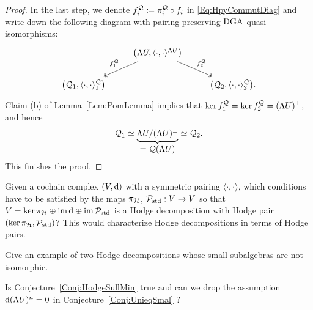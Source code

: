 \documentclass[\MainFolder/Text.tex]{subfiles}
\begin{document}
\begin{proof}
In the last step, we denote $f_i^{\mathcal{Q}}\coloneqq \pi^{\mathcal{Q}}_i \circ f_i$ in \eqref{Eq:HpyCommutDiag} and write down the following diagram with pairing-preserving $\mathrm{DGA}$-quasi-isomorphisms:
\begin{equation}\label{Eq:Diagram}
\begin{tikzcd}
& \arrow[two heads,swap]{ld}{f_1^\VansQuotient} \bigl(\Lambda U,\langle\cdot,\cdot\rangle^{\Lambda U}\bigr)\arrow[two heads]{rd}{f_2^\VansQuotient}& \\
\bigl(\VansQuotient_1,\langle\cdot,\cdot\rangle^{\VansQuotient}_1\bigr) & & \bigl(\VansQuotient_2,\langle\cdot,\cdot\rangle^{\VansQuotient}_2 \bigr).
\end{tikzcd}
\end{equation}
Claim (b) of Lemma~\ref{Lem:PomLemma} implies that $\ker f_1^{\mathcal{Q}} = \ker f_2^{\mathcal{Q}} = (\Lambda U)^\perp$, and hence
$$ \mathcal{Q}_1 \simeq  \underbrace{\Lambda U / (\Lambda U)^\perp}_{\displaystyle=\mathcal{Q}(\Lambda U)}\simeq \mathcal{Q}_2. $$
This finishes the proof.
\end{proof}


\begin{Questions}\label{Q:QuestOnPoinc}
\begin{RemarkList}
\item Given a cochain complex $(V,\mathrm{d})$ with a symmetric pairing $\langle\cdot,\cdot\rangle$, which conditions have to be satisfied by the maps $\pi_{\mathcal{H}}$, $\mathcal{P}_{\mathrm{std}}: V\rightarrow V$ so that $V=\operatorname{ker} \pi_{\mathcal{H}} \oplus \operatorname{im} \mathrm{d} \oplus \operatorname{im} \mathcal{P}_{\mathrm{std}}$ is a Hodge decomposition with Hodge pair $(\operatorname{ker} \pi_{\mathcal{H}}, \mathcal{P}_{\mathrm{std}})$? This would characterize Hodge decompositions in terms of Hodge pairs.

\item Give an example of two Hodge decompositions whose small subalgebras are not isomorphic.

\item Is Conjecture~\ref{Conj:HodgeSullMin} true and can we drop the assumption $\mathrm{d} (\Lambda U)^n = 0$ in Conjecture~\ref{Conj:UnieqSmal} ?
 \qedhere
\end{RemarkList}
\end{Questions}
\end{document}
